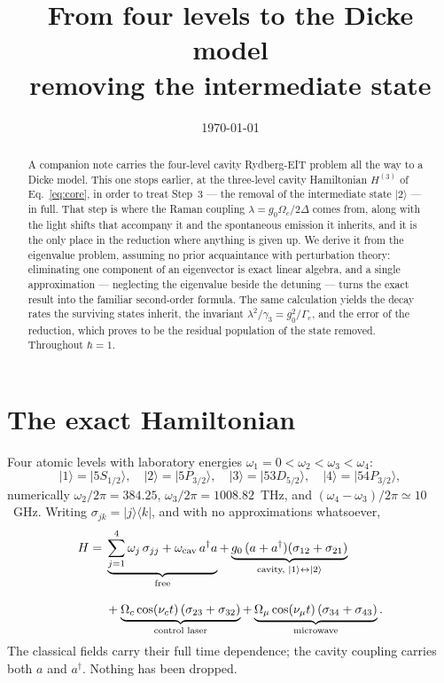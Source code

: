 \documentclass[11pt,a4paper]{article}
\title{\bfseries From four levels to the Dicke model\\[3pt]
\large removing the intermediate state}
\author{}
\date{\today}
\newcommand{\ket}[1]{\lvert #1 \rangle}
\newcommand{\bra}[1]{\langle #1 \rvert}
\newcommand{\dg}{^{\dagger}}
\newcommand{\Om}{\Omega}
\newcommand{\Omu}{\Omega_{\mu}}
\begin{document}
\maketitle
\vspace{-10mm}

\begin{abstract}\noindent
A companion note carries the four-level cavity Rydberg-EIT problem all the way to a Dicke model.
This one stops earlier, at the three-level cavity Hamiltonian $H^{(3)}$ of Eq.~\eqref{eq:core},
in order to treat Step~3 --- the removal of the intermediate state $\ket{2}$ --- in full. That
step is where the Raman coupling $\lambda=g_0\Om_c/2\Delta$ comes from, along with the light
shifts that accompany it and the spontaneous emission it inherits, and it is the only place in
the reduction where anything is given up. We derive it from the eigenvalue problem, assuming no
prior acquaintance with perturbation theory: eliminating one component of an eigenvector is
exact linear algebra, and a single approximation --- neglecting the eigenvalue beside the
detuning --- turns the exact result into the familiar second-order formula. The same calculation
yields the decay rates the surviving states inherit, the invariant
$\lambda^2/\gamma_3=g_0^2/\Gamma_e$, and the error of the reduction, which proves to be the
residual population of the state removed. Throughout $\hbar=1$.
\end{abstract}

\section{The exact Hamiltonian}

Four atomic levels with laboratory energies $\omega_1=0<\omega_2<\omega_3<\omega_4$:
\[
  \ket{1}=\ket{5S_{1/2}},\quad \ket{2}=\ket{5P_{3/2}},\quad
  \ket{3}=\ket{53D_{5/2}},\quad \ket{4}=\ket{54P_{3/2}},
\]
numerically $\omega_2/2\pi=384.25$, $\omega_3/2\pi=1008.82$~THz, and
$(\omega_4-\omega_3)/2\pi\simeq10$~GHz. Writing $\sigma_{jk}=\ket{j}\bra{k}$, and with no
approximations whatsoever,
\begin{equation}
\begin{split}
  H = {}& \underbrace{\sum_{j=1}^{4}\omega_j\,\sigma_{jj} + \omega_{\rm cav}\,a\dg a}_{\text{free}}
   + \underbrace{g_0\,(a+a\dg)(\sigma_{12}+\sigma_{21})}_{\text{cavity, }\ket{1}\leftrightarrow\ket{2}} \\[2ex]
   & + \underbrace{\Om_c\cos(\nu_c t)\,(\sigma_{23}+\sigma_{32})}_{\text{control laser}}
   + \underbrace{\Omu\cos(\nu_\mu t)\,(\sigma_{34}+\sigma_{43})}_{\text{microwave}} .
\end{split}
  \label{eq:lab}
\end{equation}
The classical fields carry their full time dependence; the cavity coupling carries both
$a$ and $a\dg$. Nothing has been dropped.
\end{document}
